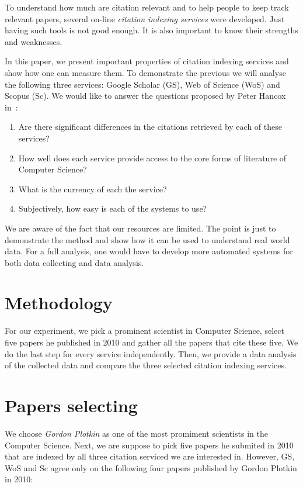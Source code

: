 \documentclass{lmcs}
\begin{document}
To understand how much are citation relevant and to help people to keep track relevant papers, several on-line \emph{citation indexing services} were developed. Just having such tools is not good enough. It is also important to know their strengths and weaknesses.

In this paper, we present important properties of citation indexing services and show how one can measure them. To demonstrate the previous we will analyse the following three services: Google Scholar (GS), Web of Science (WoS) and Scopus (Sc). We would like to answer the questions proposed by Peter Hancox in~\cite{hancox}:

\begin{enumerate}
\item Are there significant differences in the citations retrieved by each of these services?
\item How well does each service provide access to the core forms of literature of Computer Science?
\item What is the currency of each the service?
\item Subjectively, how easy is each of the systems to use?
\end{enumerate}

\bigskip

We are aware of the fact that our resources are limited. The point is just to demonstrate the method and show how it can be used to understand real world data. For a full analysis, one would have to develop more automated systems for both data collecting and data analysis.

\section{Methodology}

For our experiment, we pick a prominent scientist in Computer Science, select five papers he published in 2010 and gather all the papers that cite these five. We do the last step for every service independently. Then, we provide a data analysis of the collected data and compare the three selected citation indexing services.

\section{Papers selecting}

We choose \emph{Gordon Plotkin} as one of the most promiment scientists in the Computer Science. Next, we are suppose to pick five papers he submited in 2010 that are indexed by all three citation serviced we are interested in. However, GS, WoS and Sc agree only on the following four papers published by Gordon Plotkin in 2010\footnotemark:
\end{document}
